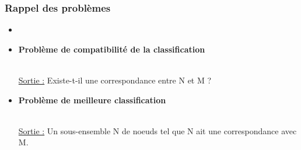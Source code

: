 \documentclass{beamer}
\begin{document}

\begin{frame}
\frametitle{Rappel des problèmes}

\begin{itemize}
\item {}
\item \begin{flushcenter} \bf Problème de compatibilité de la classification\end{flushcenter}\\ \uline{Sortie :} Existe-t-il une correspondance entre N et M ?
\item \begin{flushcenter} \bf Problème de meilleure classification\end{flushcenter}\\ \uline{Sortie :} Un sous-ensemble N de noeuds tel que N ait une correspondance avec M.
\end{itemize}


\end{frame}
\end{document}
